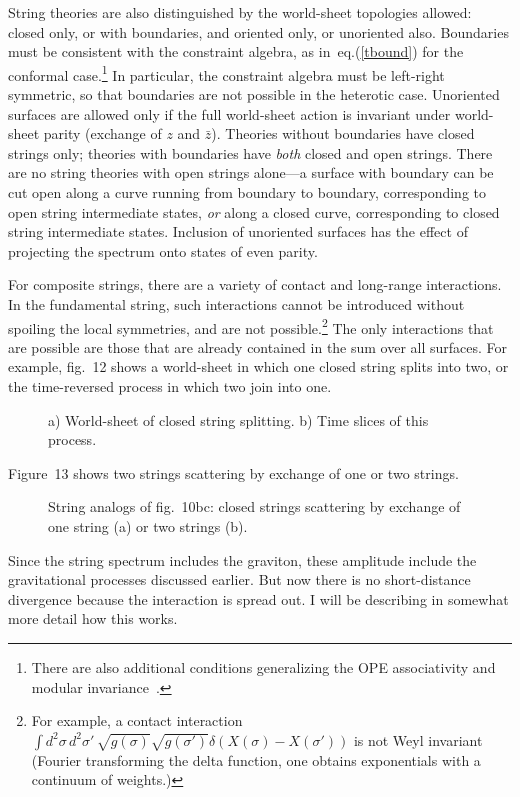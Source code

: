 String theories are also distinguished by the world-sheet topologies
allowed: closed only, or with boundaries, and oriented only, or
unoriented also.  Boundaries must be consistent with the constraint
algebra, as in~eq.(\ref{tbound}) for the conformal case.\footnote
{There are also additional conditions generalizing the OPE
associativity and modular invariance~\cite{CLew}.}  In
particular, the constraint algebra must be left-right symmetric, so
that boundaries are not possible in the heterotic case. Unoriented
surfaces are allowed only if the full world-sheet action is
invariant under world-sheet parity (exchange of $z$ and $\bar z$).
Theories without boundaries have closed strings only; theories with
boundaries have {\it both} closed and open strings.  There are no
string theories with open strings alone---a surface with boundary
can be cut open along a curve running from boundary to boundary,
corresponding to open string intermediate states, {\it or} along a
closed curve, corresponding to closed string intermediate states. 
Inclusion of unoriented surfaces has the effect of projecting the
spectrum onto states of even parity.


For composite strings, there are a variety of contact and
long-range interactions.  In the fundamental string, such
interactions cannot be introduced without spoiling the local
symmetries, and are not possible.\footnote
{For example, a contact interaction $\int d^2\sigma\,d^2\sigma'\,
\sqrt{g(\sigma)}\sqrt{g(\sigma')} \delta(X(\sigma) - X(\sigma'))$
is not Weyl invariant (Fourier transforming the delta function,
one obtains exponentials with a continuum of weights.)}
The only interactions that are possible are those that are already
contained in the sum over all surfaces.  For example, fig.~12
shows a world-sheet in which one closed string splits into two,
or the time-reversed process in which two join into one.
\begin{figure}
\begin{center}
\leavevmode
{}
\end{center}
\caption[]{a) World-sheet of closed string splitting.
b) Time slices of this process.}
\end{figure}
Figure~13 shows two strings scattering by exchange of one or two
strings.
\begin{figure}
\begin{center}
\leavevmode
{}
\end{center}
\caption[]{String analogs of fig.~10bc: closed strings scattering by 
exchange of one string (a) or two strings (b).}
\end{figure}
Since the string spectrum includes the graviton, these
amplitude include the gravitational processes discussed earlier.
But now there is no short-distance divergence because
the interaction is spread out.  I will be describing in somewhat more
detail how this works.

